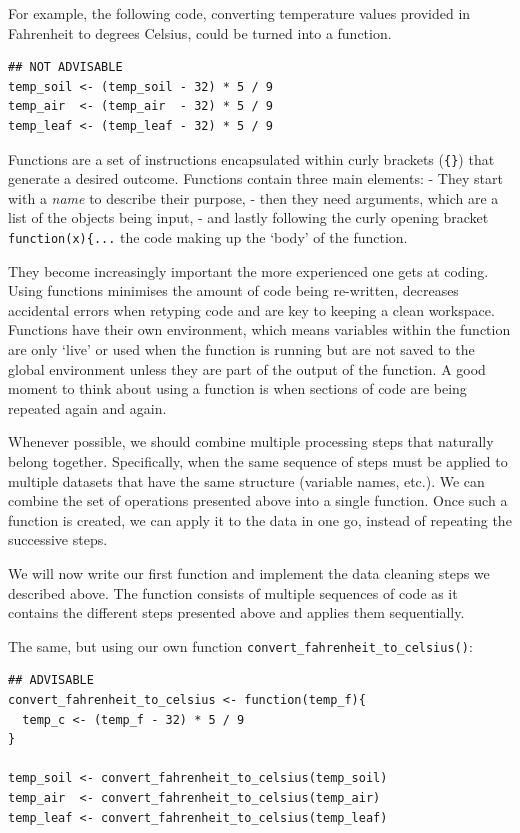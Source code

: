 \documentclass[
]{book}
\begin{document}
For example, the following code, converting temperature values provided in Fahrenheit to degrees Celsius, could be turned into a function.

\begin{verbatim}
## NOT ADVISABLE
temp_soil <- (temp_soil - 32) * 5 / 9
temp_air  <- (temp_air  - 32) * 5 / 9
temp_leaf <- (temp_leaf - 32) * 5 / 9
\end{verbatim}

Functions are a set of instructions encapsulated within curly brackets (\texttt{\{\}}) that generate a desired outcome. Functions contain three main elements:
- They start with a \emph{name} to describe their purpose,
- then they need arguments, which are a list of the objects being input,
- and lastly following the curly opening bracket \texttt{function(x)\{...} the code making up the `body' of the function.

They become increasingly important the more experienced one gets at coding. Using functions minimises the amount of code being re-written, decreases accidental errors when retyping code and are key to keeping a clean workspace. Functions have their own environment, which means variables within the function are only `live' or used when the function is running but are not saved to the global environment unless they are part of the output of the function. A good moment to think about using a function is when sections of code are being repeated again and again.

Whenever possible, we should combine multiple processing steps that naturally belong together. Specifically, when the same sequence of steps must be applied to multiple datasets that have the same structure (variable names, etc.). We can combine the set of operations presented above into a single function. Once such a function is created, we can apply it to the data in one go, instead of repeating the successive steps.

We will now write our first function and implement the data cleaning steps we described above. The function consists of multiple sequences of code as it contains the different steps presented above and applies them sequentially.

The same, but using our own function \texttt{convert\_fahrenheit\_to\_celsius()}:

\begin{verbatim}
## ADVISABLE
convert_fahrenheit_to_celsius <- function(temp_f){
  temp_c <- (temp_f - 32) * 5 / 9
}

temp_soil <- convert_fahrenheit_to_celsius(temp_soil)
temp_air  <- convert_fahrenheit_to_celsius(temp_air)
temp_leaf <- convert_fahrenheit_to_celsius(temp_leaf)
\end{verbatim}
\end{document}
